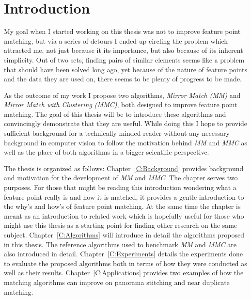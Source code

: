 \chapter*{Introduction}

My goal when I started working on this thesis was not to improve feature 
point matching, but via a series of detours I ended up circling the 
problem which attracted me, not just because it its importance, but also 
because of its inherent simplicity. Out of two sets, finding pairs of 
similar elements seems like a problem that should have been solved long 
ago, yet because of the nature of feature points and the data they are 
used on, there seems to be plenty of progress to be made.

As the outcome of my work  I propose two algorithms, \emph{Mirror Match 
(MM)} and \emph{Mirror Match with Clustering (MMC)}, both designed to 
improve feature point matching. The goal of this thesis will be to 
introduce these algorithms and convincingly demonstrate that they are 
useful. While doing this I hope to provide sufficient background for a 
technically minded reader without any necessary background in computer 
vision to follow the motivation behind \emph{MM} and \emph{MMC} as well 
as the place of both algorithms in a bigger scientific perspective.
 
The thesis is organized as follows: Chapter~\ref{C:Background} provides 
background and motivation for the development of \emph{MM} and 
\emph{MMC}. The chapter serves two purposes.  For those that might be 
reading this introduction wondering what a feature point really is and 
how it is matched, it provides a gentle introduction to the why's and 
how's of feature point matching. At the same time the chapter is meant 
as an introduction to related work which is hopefully useful for those 
who might use this thesis as a starting point for finding other research 
on the same subject. Chapter~\ref{C:Algorithms} will introduce in detail 
the algorithms proposed in this thesis. The reference algorithms used to 
benchmark \emph{MM} and \emph{MMC} are also introduced in detail.  
Chapter~\ref{C:Experiments} details the experiments done to evaluate the 
proposed algorithms both in terms of how they were conducted as well as 
their results. Chapter~\ref{C:Applications} provides two examples of how 
the matching algorithms can improve on panorama stitching and near 
duplicate matching.

